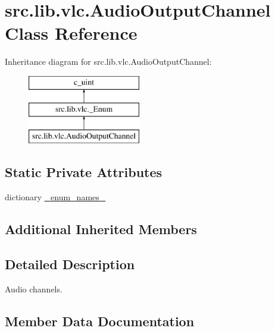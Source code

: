 \hypertarget{classsrc_1_1lib_1_1vlc_1_1AudioOutputChannel}{}\section{src.\+lib.\+vlc.\+Audio\+Output\+Channel Class Reference}
\label{classsrc_1_1lib_1_1vlc_1_1AudioOutputChannel}
Inheritance diagram for src.\+lib.\+vlc.\+Audio\+Output\+Channel\+:\begin{figure}[H]
\begin{center}
\leavevmode
\includegraphics[height=3.000000cm]{classsrc_1_1lib_1_1vlc_1_1AudioOutputChannel}
\end{center}
\end{figure}
\subsection*{Static Private Attributes}
\begin{DoxyCompactItemize}
\item 
dictionary \hyperlink{classsrc_1_1lib_1_1vlc_1_1AudioOutputChannel_ade28d35cc14a39eefc1054be45624e3e}{\+\_\+enum\+\_\+names\+\_\+}
\end{DoxyCompactItemize}
\subsection*{Additional Inherited Members}


\subsection{Detailed Description}
\begin{DoxyVerb}Audio channels.
\end{DoxyVerb}
 

\subsection{Member Data Documentation}
\hypertarget{classsrc_1_1lib_1_1vlc_1_1AudioOutputChannel_ade28d35cc14a39eefc1054be45624e3e}{}
